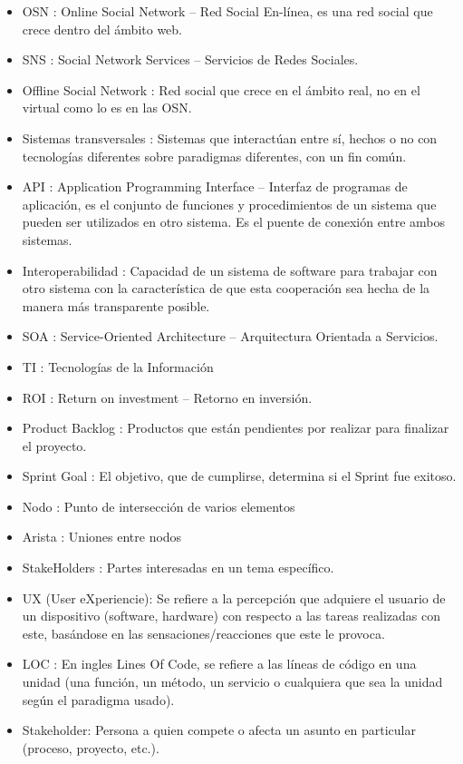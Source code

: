 \begin{itemize}
  \item OSN : Online Social Network – Red Social En-línea, es una red social que crece dentro del ámbito web.
  \item SNS : Social Network Services – Servicios de Redes Sociales.
  \item Offline Social Network : Red social que crece en el ámbito real, no en el virtual como lo es en las OSN.
  \item Sistemas transversales : Sistemas que interactúan entre sí, hechos o no con tecnologías diferentes sobre paradigmas diferentes, con un fin común.
  \item API : Application Programming Interface – Interfaz de programas de aplicación, es el conjunto de funciones y procedimientos de un sistema que pueden ser utilizados en otro sistema. Es el puente de conexión entre ambos sistemas.
  \item Interoperabilidad : Capacidad de un sistema de software para trabajar con otro sistema con la característica de que esta cooperación sea hecha de la manera más transparente posible.
  \item SOA : Service-Oriented Architecture – Arquitectura Orientada a Servicios.
  \item TI : Tecnologías de la Información
  \item ROI : Return on investment – Retorno en inversión.
  \item Product Backlog : Productos que están pendientes por realizar para finalizar el proyecto.
  \item Sprint Goal : El objetivo, que de cumplirse, determina si el Sprint fue exitoso.
  \item Nodo : Punto de intersección de varios elementos
  \item Arista : Uniones entre nodos
  \item StakeHolders : Partes interesadas en un tema específico.
  \item UX (User eXperiencie): Se refiere a la percepción que adquiere el usuario de un dispositivo (software, hardware) con respecto a las tareas realizadas con este, basándose en las sensaciones/reacciones que este le provoca.
  \item LOC : En ingles Lines Of Code, se refiere a las líneas de código en una unidad (una función, un método, un servicio o cualquiera que sea la unidad según el paradigma usado).
  \item Stakeholder: Persona a quien compete o afecta un asunto en particular (proceso, proyecto, etc.).
\end{itemize}
